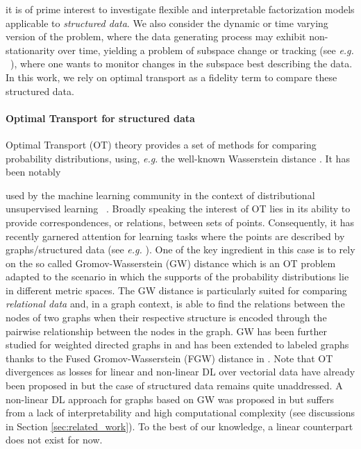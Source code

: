 \documentclass{article}
\begin{document}
{		it is of prime interest to investigate flexible and interpretable
		factorization models applicable to \emph{structured data}. We also consider the dynamic or time varying version of the problem, where the data generating process may exhibit non-stationarity over time, yielding a problem of subspace change or tracking (see {\em e.g.} ~\cite{narayanamurthy2018nearly}), where one wants to monitor changes in the subspace best describing the data. In this work, we rely on optimal transport as a fidelity term to compare these structured data. 
		
		\paragraph{Optimal Transport for structured data}
		Optimal Transport (OT) theory provides a set of methods for comparing probability distributions, using, \emph{e.g.} the well-known Wasserstein
		distance \citep{villani-topics-2003}. 
		It has been notably} used by the machine learning community {in the
		context of distributional unsupervised learning}
	~\citep{arjovsky2017wasserstein, schmitz2018wasserstein,peyre-computational-2020}. Broadly speaking the interest of OT lies in its
	ability to provide correspondences, or relations, between sets of points.
	Consequently, it has recently garnered attention for learning tasks where
	the points are described by graphs/structured data (see  \emph{e.g.}
	\cite{DBLP:conf/aaai/NikolentzosMV17,maretic2019got,Togninalli19,xu2019scalable,vayer-optimal-nodate,barbe:hal-02795056}).
	One of the key ingredient in this case is to rely on the so called
	Gromov-Wasserstein (GW) distance
	\citep{memoli-gromovwasserstein-2011,sturm2012space} which is an OT
	problem adapted to the scenario in which the supports of the probability
	distributions lie in different metric spaces. The GW distance is
	particularly suited for comparing \emph{relational data}
	\cite{peyre2016gromov,solomon_entropic_2016} and, in a graph context, is
	able to find the relations between the nodes of two graphs when their
	respective structure is encoded through the pairwise relationship between
	the nodes in the graph. GW has been further studied for weighted directed
	graphs in \citep{chowdhury2019gromov} and has been extended to labeled
	graphs thanks to the Fused Gromov-Wasserstein (FGW) distance in
	\citep{vayer-fused-2018}. Note that OT divergences as losses for linear and
	non-linear DL over vectorial data have already been proposed in
	\citep{BTSSPP15,rolet2016fast, schmitz2018wasserstein} but the case of
	structured data remains quite unaddressed. A non-linear DL approach for
	graphs based on GW was proposed in \citep{xu_gromov-wasserstein_2019} but
	suffers from a lack of interpretability and high computational complexity
	(see discussions in Section \ref{sec:related_work}). To the best of our knowledge, a linear
	counterpart does not exist for now.
\end{document}
